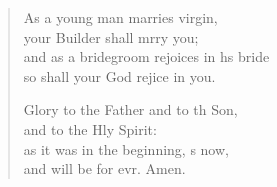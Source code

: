 \begin{verse}
\begin{patverse}
As a young man marries  virgin,\Med\\
your Builder shall mrry you;\\
and as a bridegroom rejoices in h\pointup{\i}s bride\Med\\
so shall your God rejice in you.

Glory to the Father and to th Son,\Med\\
    and to the Hly Spirit:\\
as it was in the beginning, \pointup{\i}s now,\Med\\
    and will be for evr. Amen.
  \end{patverse}
\end{verse}
